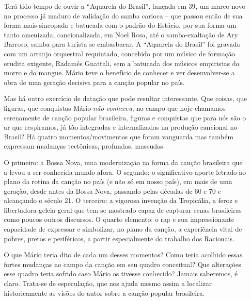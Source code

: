 Terá tido tempo de ouvir a ``Aquarela do Brasil'', lançada em 39, um
marco novo no processo já maduro de validação do samba carioca -- que
passou então de sua forma mais sincopada e batucada com o padrão do
Estácio, por sua forma um tanto amenizada, cancionalizada, em Noel Rosa,
até o samba-exaltação de Ary Barroso, samba para turista se embasbacar.
A ``Aquarela do Brasil'' foi gravada com um arranjo orquestral
requintado, concebido por um músico de formação erudita exigente,
Radamés Gnattali, sem a batucada dos músicos empiristas do morro e do
mangue. Mário teve o benefício de conhecer e ver desenvolver-se a obra
de uma geração decisiva para a canção popular no país.

Mas há outro exercício de datação que pode resultar interessante. Que
coisas, que figuras, que conquistas Mário \emph{não conheceu}, no campo
que hoje chamamos serenamente de canção popular brasileira, figuras e
conquistas que para nós são o ar que respiramos, já tão integradas e
internalizadas na produção cancional no Brasil? Há quatro
momentos/movimentos que foram vanguarda mas também expressam mudanças
tectônicas, profundas, massudas.

O primeiro: a Bossa Nova, uma modernização na forma da canção brasileira
que a levou a ser conhecida mundo afora. O segundo: o significativo
aporte letrado ao plano da rotina da canção no país (e não só em nosso
país), em mais de uma geração, desde antes da Bossa Nova, passando pelas
décadas de 60 e 70 e alcançando o século 21. O terceiro: a vigorosa
invenção da Tropicália, a feroz e libertadora geleia geral que tem se
mostrado capaz de capturar cenas brasileiras como poucos outros
discursos. O quarto elemento: o rap e sua impressionante capacidade de
expressar e simbolizar, no plano da canção, a experiência vital de
pobres, pretos e periféricos, a partir especialmente do trabalho dos
Racionais.

O que Mário teria dito de cada um desses momentos? Como teria acolhido
essas fortes mudanças no campo da canção em seu quadro conceitual? Que
alterações esse quadro teria sofrido caso Mário os tivesse conhecido?
Jamais saberemos, é claro. Trata-se de especulação, que nos ajuda mesmo
assim a localizar historicamente as visões do autor sobre a canção
popular brasileira.

